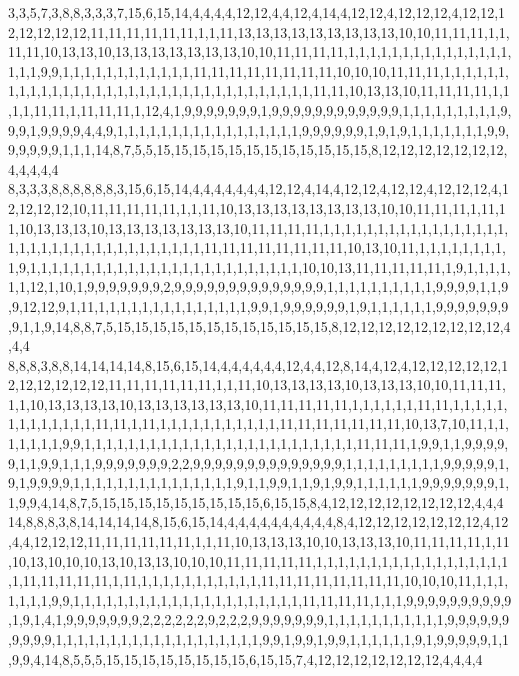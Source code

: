 3,3,5,7,3,8,8,3,3,3,7,15,6,15,14,4,4,4,4,12,12,4,4,12,4,14,4,12,12,4,12,12,12,4,12,12,12,12,12,12,12,11,11,11,11,11,11,1,1,11,13,13,13,13,13,13,13,13,13,10,10,11,11,11,1,1,11,11,10,13,13,10,13,13,13,13,13,13,13,10,10,11,11,11,11,1,1,1,1,1,1,1,1,1,1,1,1,1,1,1,1,1,1,9,9,1,1,1,1,1,1,1,1,1,1,1,1,11,11,11,11,11,11,11,11,10,10,10,11,11,11,1,1,1,1,1,1,1,1,1,1,1,1,1,1,1,1,1,1,1,1,1,1,1,1,1,1,1,1,1,1,1,1,1,1,11,11,10,13,13,10,11,11,11,11,1,1,1,1,11,11,1,11,11,11,1,12,4,1,9,9,9,9,9,9,9,1,9,9,9,9,9,9,9,9,9,9,9,9,1,1,1,1,1,1,1,1,1,9,9,9,1,9,9,9,9,4,4,9,1,1,1,1,1,1,1,1,1,1,1,1,1,1,1,1,1,9,9,9,9,9,9,1,9,1,9,1,1,1,1,1,1,1,9,9,9,9,9,9,9,1,1,1,14,8,7,5,5,15,15,15,15,15,15,15,15,15,15,15,15,8,12,12,12,12,12,12,12,4,4,4,4,4
8,3,3,3,8,8,8,8,8,8,3,15,6,15,14,4,4,4,4,4,4,4,12,12,4,14,4,12,12,4,12,12,4,12,12,12,4,12,12,12,12,10,11,11,11,11,11,1,1,11,10,13,13,13,13,13,13,13,13,10,10,11,11,11,1,11,11,10,13,13,13,10,13,13,13,13,13,13,13,10,11,11,11,11,1,1,1,1,1,1,1,1,1,1,1,1,1,1,1,1,1,1,1,1,1,1,1,1,1,1,1,1,1,1,1,1,1,1,1,11,11,11,11,11,11,11,11,10,13,10,11,1,1,1,1,1,1,1,1,1,9,1,1,1,1,1,1,1,1,1,1,1,1,1,1,1,1,1,1,1,1,1,1,1,1,1,10,10,13,11,11,11,11,11,1,9,1,1,1,1,1,1,12,1,10,1,9,9,9,9,9,9,9,2,9,9,9,9,9,9,9,9,9,9,9,9,9,9,1,1,1,1,1,1,1,1,1,1,9,9,9,9,1,1,9,9,12,12,9,1,11,1,1,1,1,1,1,1,1,1,1,1,1,1,1,9,9,1,9,9,9,9,9,9,1,9,1,1,1,1,1,1,9,9,9,9,9,9,9,9,1,1,9,14,8,8,7,5,15,15,15,15,15,15,15,15,15,15,15,15,8,12,12,12,12,12,12,12,12,12,4,4,4
8,8,8,3,8,8,14,14,14,14,8,15,6,15,14,4,4,4,4,4,4,12,4,4,12,8,14,4,12,4,12,12,12,12,12,12,12,12,12,12,12,11,11,11,11,11,11,1,1,11,10,13,13,13,13,10,13,13,13,10,10,11,11,11,1,1,10,13,13,13,13,10,13,13,13,13,13,13,10,11,11,11,11,11,1,1,1,1,1,1,11,11,1,1,1,1,1,1,1,1,1,1,1,1,1,11,11,1,11,1,1,1,1,1,1,1,1,1,1,1,11,11,11,11,11,11,11,10,13,7,10,11,1,1,1,1,1,1,1,9,9,1,1,1,1,1,1,1,1,1,1,1,1,1,1,1,1,1,1,1,1,1,1,1,1,1,11,11,11,1,9,9,1,1,9,9,9,9,9,1,1,9,9,1,1,1,9,9,9,9,9,9,9,2,2,9,9,9,9,9,9,9,9,9,9,9,9,9,9,1,1,1,1,1,1,1,1,1,9,9,9,9,9,1,9,1,9,9,9,9,1,1,1,1,1,1,1,1,1,1,1,1,1,1,1,9,1,1,9,9,1,1,9,1,9,9,1,1,1,1,1,1,9,9,9,9,9,9,9,1,1,9,9,4,14,8,7,5,15,15,15,15,15,15,15,15,15,6,15,15,8,4,12,12,12,12,12,12,12,12,4,4,4
14,8,8,8,3,8,14,14,14,14,8,15,6,15,14,4,4,4,4,4,4,4,4,4,4,8,4,12,12,12,12,12,12,12,4,12,4,4,12,12,12,11,11,11,11,11,11,1,1,11,10,13,13,13,10,10,13,13,13,10,11,11,11,11,1,11,10,13,10,10,10,13,10,13,13,10,10,10,11,11,11,11,11,1,1,1,1,1,1,1,1,1,1,1,1,1,1,1,1,1,1,1,11,11,11,11,11,1,11,1,1,1,1,1,1,1,1,1,1,1,11,11,11,11,11,11,11,11,10,10,10,11,1,1,1,1,1,1,1,9,9,1,1,1,1,1,1,1,1,1,1,1,1,1,1,1,1,1,1,1,1,1,11,11,11,11,1,1,1,9,9,9,9,9,9,9,9,9,9,1,9,1,4,1,9,9,9,9,9,9,9,2,2,2,2,2,2,9,2,2,2,9,9,9,9,9,9,9,1,1,1,1,1,1,1,1,1,1,1,9,9,9,9,9,9,9,9,9,9,1,1,1,1,1,1,1,1,1,1,1,1,1,1,1,1,1,1,1,9,9,1,9,9,1,9,9,1,1,1,1,1,1,9,1,9,9,9,9,9,1,1,9,9,4,14,8,5,5,5,15,15,15,15,15,15,15,15,6,15,15,7,4,12,12,12,12,12,12,12,4,4,4,4
